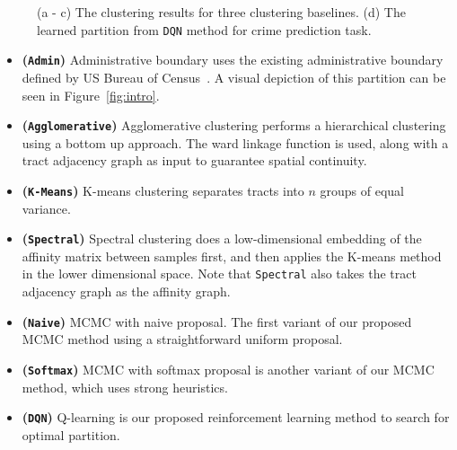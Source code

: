 \begin{figure}[t!]
\caption{(a - c) The clustering results for three clustering baselines. (d) The learned partition from \texttt{DQN} method for crime prediction task.}
\label{fig:partitions}
\end{figure}



\begin{itemize}[leftmargin=*]
\item \textbf{(\texttt{Admin})} Administrative boundary  uses the existing administrative boundary defined by US Bureau of Census~\cite{census:2010}. A visual depiction of this partition can be seen in Figure~\ref{fig:intro}. %
\item \textbf{(\texttt{Agglomerative})} Agglomerative clustering performs a hierarchical clustering using a bottom up approach. The ward linkage function is used, along with a tract adjacency graph as input to guarantee spatial continuity. %
\item \textbf{(\texttt{K-Means})} K-means clustering separates tracts into $n$ groups of equal variance.%
\item \textbf{ (\texttt{Spectral})} Spectral clustering does a low-dimensional embedding of the affinity matrix between samples first, and then applies the K-means method in the lower dimensional space. Note that \texttt{Spectral} also takes the tract adjacency graph as the affinity graph.
\item \textbf{(\texttt{Naive})} MCMC with naive proposal. The first variant of our proposed MCMC method using a straightforward uniform proposal.
\item \textbf{(\texttt{Softmax})} MCMC with softmax proposal is another variant of our MCMC method, which uses strong heuristics.
\item \textbf{(\texttt{DQN})} Q-learning is our proposed reinforcement learning method to search for optimal partition.
\end{itemize}

